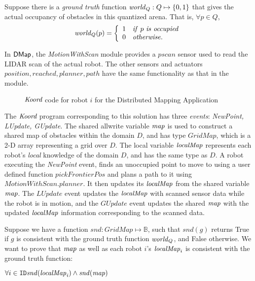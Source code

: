Suppose there is a \emph{ground truth} function $\mathit{world}_Q : Q \mapsto \left\{0,1\right\}$ that gives the actual occupancy of obstacles in this quantized arena. That is, $\forall p \in Q$,
\begin{align}
\mathit{world}_Q(p) =
		\left\{
		\begin{array}{ll}
			1 & \mathit{if}\ p \ \mathit{is \ occupied}\\
			0 & \mathit{otherwise}.
		\end{array}
		\right.
\end{align}

\newcommand{\MotionWithScan}{\emph{MotionWithScan}\xspace}

In ${\sf DMap}$, the \MotionWithScan module provides a $\mathit{pscan}$ sensor used to read the LIDAR scan of the actual robot. The other sensors and actuators $\mathit{position,reached,planner,path}$ have the same functionality as that in the \Motion module.

\begin{figure}[t]
    {
    
    }
    {
    
    }
    \caption{ $\emph{Koord}$ code for robot $i$ for the Distributed Mapping Application}
    \label{fig:mapapp }
\end{figure}

 The $\emph{Koord}$ program corresponding to this solution has three \emph{events}: \emph{NewPoint, LUpdate, GUpdate}. The shared allwrite variable $\mathit{map}$ is used to construct a shared map of obstacles within the domain $D$, and has type $\mathit{GridMap}$, which is a 2-D array representing a grid over $D$. The local variable $\mathit{localMap}$ represents each robot's \emph{local} knowledge of the domain $D$, and has the same type as $D$. A robot executing the \emph{NewPoint} event, finds an unoccupied point to move to using a user defined function $\mathit{pickFrontierPos}$ and plans a path to it using $\mathit{MotionWithScan.planner}$. It then updates its $\mathit{localMap}$ from the shared variable $\mathit{map}$. The $\mathit{LUpdate}$ event updates the $\mathit{localMap}$ with scanned sensor data while the robot is in motion, and the $\mathit{GUpdate}$ event updates the shared $\mathit{map}$ with the updated $\mathit{localMap}$ information corresponding to the scanned data.


Suppose we have a function $\mathit{snd}: GridMap \mapsto \mathbb{B}$, such that $\mathit{snd}(g)$ returns True if $g$ is consistent with the ground truth function $\mathit{world}_Q$, and False otherwise. We want to prove that $\mathit{map}$ as well as each robot $i$'s $\mathit{localMap}_i$ is consistent with the ground truth function:
\begin{invariant}
    \label{inv:mapping}
    $\forall i \in \texttt{ID} \mathit{snd(\mathit{localMap}_i)} \wedge \mathit{snd(\mathit{map})}$
\end{invariant}

